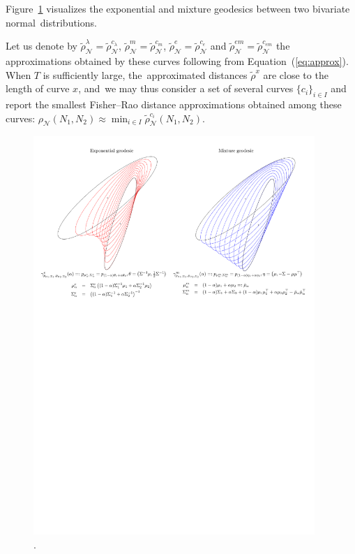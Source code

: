 \documentclass[entropy,article,accept,oneauthor,pdftex,entropy]{Definitions/mdpi}
\def\calN{\mathcal{N}}
\begin{document}
Figure~\ref{fig:vizemgeo2d} visualizes the exponential and mixture geodesics between two bivariate normal~distributions.

Let us denote by $\tilde\rho^{\lambda}_\calN=\tilde\rho^{c_\lambda}_\calN$,
 $\tilde\rho^{m}_\calN=\tilde\rho^{c_m}_\calN$, 
 $\tilde\rho^{e}_\calN=\tilde\rho^{c_e}_\calN$ and 
 $\tilde\rho^{em}_\calN=\tilde\rho^{c_{em}}_\calN$ the approximations obtained by these curves following from Equation~(\ref{eq:approx}).
When $T$ is sufficiently large, the~approximated distances $\tilde\rho^{x}$ are close to the length of curve $x$, and~we may thus consider a set of several curves $\{c_i\}_{i\in I}$ and report the smallest Fisher--Rao distance approximations obtained among these curves: 
$\rho_\calN(N_1,N_2)\approx \min_{i\in I} \tilde\rho_\calN^{c_i}(N_1,N_2)$. 

\begin{figure}[H]

\includegraphics[width=0.95\textwidth]{FigIpe-BivariateInterpolation.pdf} 
\caption{.\label{fig:vizemgeo2d}}
\end{figure}
\end{document}
